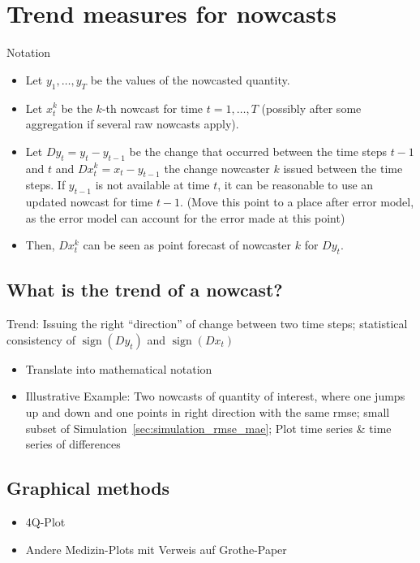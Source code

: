 \documentclass[oneside]{article}
\theoremstyle{plain}%
\theoremstyle{definition}
\DeclareMathOperator{\sign}{sign}
\newcommand{\ydiff}{D y}
\newcommand{\xdiff}{Dx}
\begin{document}
\section{Trend measures for nowcasts}

Notation
\begin{itemize}
  \item Let $y_1, \ldots, y_T$ be the values of the nowcasted quantity.
  \item Let $x_t^k$ be the $k$-th nowcast for time $t = 1, \ldots, T$ (possibly after some aggregation if several raw nowcasts apply).
  \item Let $\ydiff_t = y_t - y_{t-1}$ be the change that occurred between the time steps $t-1$ and $t$ and $\xdiff_t^k = x_t - y_{t-1}$ the change nowcaster $k$ issued between the time steps. If $y_{t-1}$ is not available at time $t$, it can be reasonable to use an updated nowcast for time $t-1$. (Move this point to a place after error model, as the error model can account for the error made at this point)
  \item Then, $\xdiff_t^k$ can be seen as point forecast of nowcaster $k$ for $\ydiff_t$. 
\end{itemize}

\subsection{What is the trend of a nowcast?}

Trend: Issuing the right \enquote{direction} of change between two time steps; statistical consistency of $\sign(\ydiff_t)$ and $\sign(\xdiff_t)$

\begin{itemize}
  \item Translate into mathematical notation
  \item Illustrative Example: Two nowcasts of quantity of interest, where one jumps up and down and one points in right direction with the same rmse; small subset of Simulation~\ref{sec:simulation_rmse_mae}; Plot time series \& time series of differences
\end{itemize}

\subsection{Graphical methods}


\begin{itemize}
  \item 4Q-Plot
  \item Andere Medizin-Plots mit Verweis auf Grothe-Paper
\end{itemize}
\end{document}
